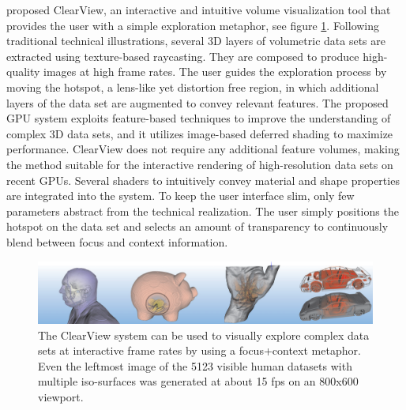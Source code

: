   
\cite{4015450} proposed ClearView, an interactive and intuitive volume
visualization tool that provides the user with a simple exploration
metaphor, see figure \ref{fig:clearview}. Following traditional technical illustrations, several 3D
layers of volumetric data sets are extracted using texture-based raycasting.
They are composed to produce high-quality images at high
frame rates. The user guides the exploration process by moving the
hotspot, a lens-like yet distortion free region, in which additional layers
of the data set are augmented to convey relevant features. The proposed
GPU system exploits feature-based techniques to improve the
understanding of complex 3D data sets, and it utilizes image-based
deferred shading to maximize performance. ClearView does not require
any additional feature volumes, making the method suitable for
the interactive rendering of high-resolution data sets on recent GPUs.
Several shaders to intuitively convey material and shape properties are
integrated into the system. To keep the user interface slim, only few
parameters abstract from the technical realization. The user simply
positions the hotspot on the data set and selects an amount of transparency
to continuously blend between focus and context information.
\begin{figure}
\centering
\includegraphics[width=\textwidth]{Figures/clearview}
\decoRule
\caption[ clearview]{ The ClearView system can be used to visually explore complex data sets at interactive frame rates by using a focus+context metaphor. Even the leftmost image
of the 5123 visible human datasets with multiple iso-surfaces was generated at about 15 fps on an 800x600 viewport.}
\label{fig:clearview}
\end{figure}


